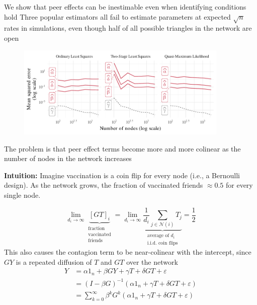 \documentclass[final]{beamer}
\newcommand{\Ni}{\mathcal N(i)}
\newlength{\colwidth}
\begin{document}
\begin{frame}[t]
\begin{columns}[t]
\begin{column}{\colwidth}
            \begin{block}{We show that peer effects can be inestimable even when identifying conditions hold}
                Three popular estimators all fail to estimate parameters at expected $\sqrt{n}$ rates in simulations, even though half of all possible triangles in the network are open
                \begin{figure}
                    \centering
                    \includegraphics[width=0.9\textwidth]{./figures/simulations/biometrika-mse.pdf}
                \end{figure}
            \end{block}

            \begin{block}{The problem is that peer effect terms become more and more colinear as the number of nodes in the network increases}

                \textbf{Intuition:} Imagine vaccination is a coin flip for every node (i.e., a Bernoulli design). As the network grows, the fraction of vaccinated friends $\approx 0.5$ for every single node.

                \begin{equation} \label{eq:avg}
                    \lim_{d_i \to \infty}
                    \underbrace{[GT]_i}_{\substack{\text{fraction} \\ \text{vaccinated} \\ \text{friends}}}
                    =
                    \lim_{d_i \to \infty}
                    \underbrace{
                        \frac{1}{d_i} \sum_{j \in \Ni} T_j
                    }_{\substack{\text{average of $d_i$}           \\ \text{i.i.d. coin flips}}}
                    = \frac 12
                \end{equation}
                This also causes the contagion term to be near-colinear with the intercept, since $GY$ is a repeated diffusion of $T$ and $GT$ over the network
                \begin{align*}
                    Y & = \alpha 1_n + \beta G Y + \gamma T + \delta G T + \varepsilon                                \\
                      & = \left(I - \beta G\right)^{-1} \left(\alpha 1_n + \gamma T + \delta G T + \varepsilon\right) \\
                      & = \sum_{k=0}^\infty \beta^k G^k \left(\alpha 1_n + \gamma T + \delta G T + \varepsilon\right)
                \end{align*}


\end{block}
\end{column}
\end{columns}
\end{frame}
\end{document}
